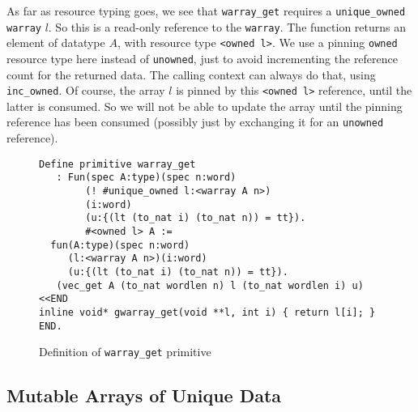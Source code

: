 \documentclass[9pt,natbib]{sigplanconf}
\begin{document}
As far as resource typing goes, we see that \texttt{warray\_get}
requires a \texttt{unique\_owned} \texttt{warray} $l$.  So this is a
read-only reference to the \texttt{warray}.  The function returns an
element of datatype $A$, with resource type \texttt{<owned l>}.  We
use a pinning \texttt{owned} resource type here instead of
\texttt{unowned}, just to avoid incrementing the reference count for
the returned data.  The calling context can always do that, using
\texttt{inc\_owned}.  Of course, the array $l$ is pinned by this
\texttt{<owned l>} reference, until the latter is consumed.  So we
will not be able to update the array until the pinning reference has
been consumed (possibly just by exchanging it for an \texttt{unowned}
reference).

\begin{figure}
\small
\begin{verbatim}
Define primitive warray_get
   : Fun(spec A:type)(spec n:word)
        (! #unique_owned l:<warray A n>)
        (i:word)
        (u:{(lt (to_nat i) (to_nat n)) = tt}).
        #<owned l> A := 
  fun(A:type)(spec n:word)
     (l:<warray A n>)(i:word)
     (u:{(lt (to_nat i) (to_nat n)) = tt}). 
   (vec_get A (to_nat wordlen n) l (to_nat wordlen i) u)
<<END
inline void* gwarray_get(void **l, int i) { return l[i]; }
END.
\end{verbatim}
\caption{Definition of \texttt{warray\_get} primitive}
\label{fig:warrayget}
\end{figure}

\subsection{Mutable Arrays of Unique Data}
\end{document}
